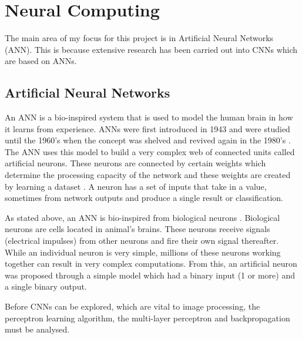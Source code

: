 \section{Neural Computing}
The main area of my focus for this project is in
Artificial Neural Networks (ANN). This is because extensive research has been carried out into CNNs which are based on ANNs.
\tocless\subsection{Artificial Neural Networks}
An ANN is a bio-inspired system that is used to model the human brain in how it learns from experience.
ANNs were first introduced in 1943 and were studied until the 1960's when the concept was shelved and revived again in the 1980's \parencite{handsOnML}.
The ANN uses this model to build a very complex web of connected units called
artificial neurons.
These neurons are connected by certain weights which determine the processing
capacity of the network and these weights are created by learning a
dataset \parencite{malachy}.
A neuron has a set of inputs that take in a value, sometimes from network outputs
and produce a single result or classification.

As stated above, an ANN is bio-inspired from biological neurons \parencite{handsOnML}.
Biological neurons are cells located in animal's brains.
These neurons receive signals (electrical impulses) from other neurons and fire their own signal thereafter.
While an individual neuron is very simple, millions of these neurons working together can result in very complex computations.
From this, an artificial neuron was proposed through a simple model which had a binary input (1 or more) and a single binary output.


Before CNNs can be explored, which are vital to image
processing, the perceptron learning algorithm, the multi-layer perceptron and backpropagation must be analysed.




